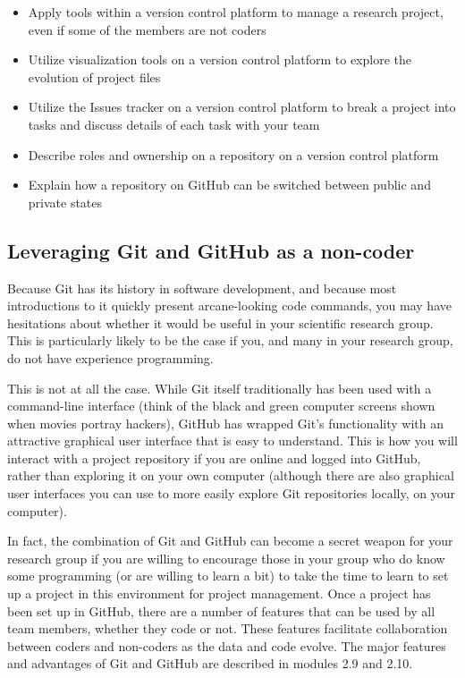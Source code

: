 \documentclass[]{tufte-book}
\providecommand{\tightlist}{%
  \setlength{\itemsep}{0pt}\setlength{\parskip}{0pt}}
\begin{document}
\begin{itemize}
\tightlist
\item
  Apply tools within a version control platform to manage a research project,
  even if some of the members are not coders
\item
  Utilize visualization tools on a version control platform to explore the
  evolution of project files
\item
  Utilize the Issues tracker on a version control platform to break a project
  into tasks and discuss details of each task with your team
\item
  Describe roles and ownership on a repository on a version control platform
\item
  Explain how a repository on GitHub can be switched between public and private
  states
\end{itemize}

\subsection{Leveraging Git and GitHub as a non-coder}\label{leveraging-git-and-github-as-a-non-coder}

Because Git has its history in software development, and because most
introductions to it quickly present arcane-looking code commands, you may have
hesitations about whether it would be useful in your scientific research group.
This is particularly likely to be the case if you, and many in your research
group, do not have experience programming.

This is not at all the case. While Git itself traditionally has been used with a
command-line interface (think of the black and green computer screens shown when
movies portray hackers), GitHub has wrapped Git's functionality with an
attractive graphical user interface that is easy to understand. This is how you
will interact with a project repository if you are online and logged into
GitHub, rather than exploring it on your own computer (although there are also
graphical user interfaces you can use to more easily explore Git repositories
locally, on your computer).

In fact, the combination of Git and GitHub can become a secret weapon for your
research group if you are willing to encourage those in your group who do know
some programming (or are willing to learn a bit) to take the time to learn to
set up a project in this environment for project management. Once a project has
been set up in GitHub, there are a number of features that can be used by all
team members, whether they code or not. These features facilitate collaboration
between coders and non-coders as the data and code evolve. The major features
and advantages of Git and GitHub are described in modules 2.9 and 2.10.
\end{document}
